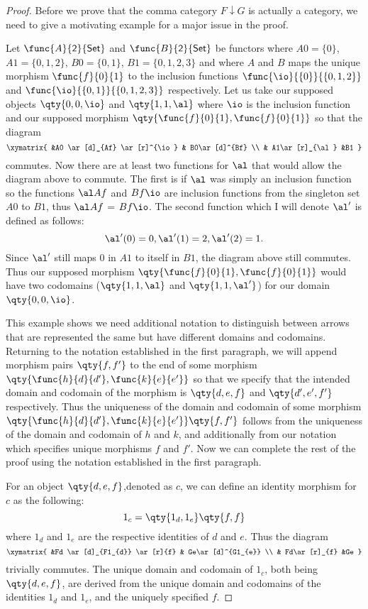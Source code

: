\documentclass[main.tex]{subfiles}
\begin{document}
\begin{proof}
	Before we prove that the comma category $F\downarrow G$ is actually a
	category, we need to give a motivating example for a major issue in the
	proof.

	Let \(\func{A}{\mathsf{2}}{\mathsf{Set}}\) and
	\(\func{B}{\mathsf{2}}{\mathsf{Set}}\) be functors where $A0 = \{0\}$, $A1 =
	\{0,1,2\}$, $B0 = \{0,1\}$, $B1 = \{0,1,2,3\}$ and where $A$ and $B$ maps
	the unique morphism \(\func{f}{0}{1}\) to the inclusion functions
	\(\func{\io}{\{0\}}{\{0,1,2\}}\)  and \(\func{\io}{\{0,1\}}{\{0,1,2,3\}}\)
	respectively. Let us take our supposed objects $\qty{0,0,\io}$  and
	$\qty{1,1,\al}$ where $\io$ is the inclusion function and our supposed
	morphism $\qty{\func{f}{0}{1},\func{f}{0}{1}}$ so that the diagram
	\[\xymatrix{ &A0 \ar[d]_{Af} \ar[r]^{\io} & B0\ar[d]^{Bf}  \\  &
	A1\ar[r]_{\al} &B1   } \] commutes. Now there are at least two functions for
	$\al$ that would allow the diagram above to commute. The first is if $\al$
	was simply an inclusion function so the functions $\al  Af$ and $Bf
	 \io$ are inclusion functions from the singleton set $A0$ to $B1$, thus
	$\al  Af$ =  $Bf  \io$. The second function which I will denote
	$\al'$ is defined as follows:\[ \al'(0) = 0, \al'(1) = 2,\al'(2) = 1.\]
	Since $\al'$ still maps $0$ in $A1$ to itself in $B1$, the diagram above
	still commutes. Thus our supposed morphism
	$\qty{\func{f}{0}{1},\func{f}{0}{1}}$ would have two codomains
	($\qty{1,1,\al}$ and $\qty{1,1,\al'}$) for our domain $\qty{0,0,\io}$.

	This example shows we need additional notation to distinguish between arrows
	that are represented the same but have different domains and codomains.
	Returning to the notation established in the first paragraph, we will append
	morphism pairs $\qty{f,f'}$ to the end of some morphism
	$\qty{\func{h}{d}{d'},\func{k}{e}{e'}}$ so that we specify that the intended
	domain and codomain of the morphism is $\qty{d,e,f}$ and $\qty{d',e',f'}$
	respectively. Thus the uniqueness of the domain and codomain of some
	morphism $\qty{\func{h}{d}{d'},\func{k}{e}{e'}} \qty{f,f'}$ follows from the
	uniqueness of the domain and codomain of $h$ and $k$, and additionally from
	our notation which specifies unique morphisms $f$ and $f'$. Now we can
	complete the rest of the proof using the notation established in the first
	paragraph.

	For an object $\qty{d,e,f}$,denoted as $c$, we can define an identity
	morphism for $c$ as the following:  \[ 1_c  = \qty{1_{d},1_{e}}\qty{f,f}\]
	where $1_{d}$ and $1_{e}$ are the respective identities of $d$ and $e$. Thus
	the diagram \[\xymatrix{ &Fd \ar[d]_{F1_{d}} \ar[r]{f} & Ge\ar[d]^{G1_{e}}
						 \\  & Fd\ar[r]_{f} &Ge   } \] trivially commutes. The
		unique domain and codomain of $1_c$, both being $\qty{d,e,f}$, are
		derived from the unique domain and codomains of the identities $1_d$ and
		$1_e$, and the uniquely specified $f$.


\end{proof}
\end{document}
